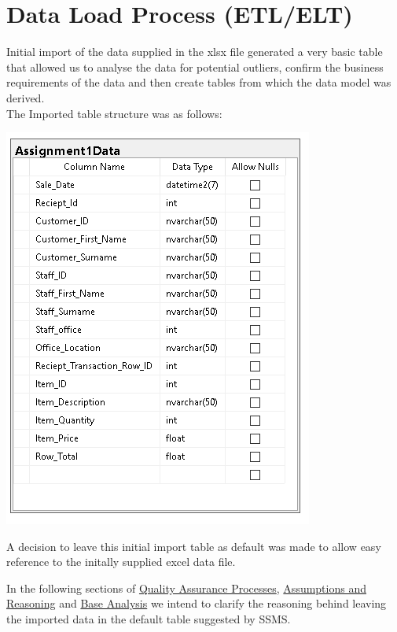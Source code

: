 \documentclass{article}
\begin{document}
    \newpage
    \section{Data Load Process (ETL/ELT)}
        Initial import of the data supplied in the xlsx file generated a very basic table
        that allowed us to analyse the data for potential outliers, confirm the business
        requirements of the data and then create tables from which the data model was derived.
        \\
        The Imported table structure was as follows:
        \begin{center}
            \includegraphics{Images/Initial_Import.PNG}
        \end{center}

        A decision to leave this initial import table as default
        was made to allow easy reference to the initally supplied
        excel data file.
        \par
        In the following sections of \hyperref[sec:QAP]{\color{blue}Quality Assurance Processes}, \hyperref[sec:AR]{\color{blue}Assumptions and Reasoning} and \hyperref[sec:BA]{\color{blue}Base Analysis} we intend to clarify the reasoning behind leaving the imported data in
        the default table suggested by SSMS.

        \newpage
\end{document}
